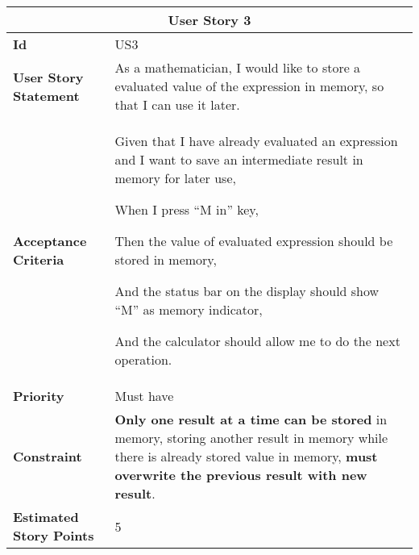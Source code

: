 \hspace{1cm}
\begin{center}
\begin{tabular}{ | m{2.3cm} | m{12cm} | } 

 \hline
 \multicolumn{2}{|c|}{\textbf{User Story 3}} \\

\hline
\textbf{Id} & US3 \\ 

\hline
\textbf{User Story Statement} &  As a mathematician, I would like to store a evaluated value of the expression in memory, so that I can use it later.\\

\hline
\textbf{Acceptance Criteria} & Given that I have already evaluated an expression and I want to save an intermediate result in memory for later use,

When I press ``M in'' key,

Then the value of evaluated expression should be stored in memory,

And the status bar on the display should show ``M'' as memory indicator,

And the calculator should allow me to do the next operation.\\ 

\hline
\textbf{Priority} & Must have \\ 

\hline
\textbf{Constraint} & \textbf{Only one result at a time can be stored} in memory, storing another result in memory while there is already stored value in memory, \textbf{ must overwrite the previous result with new result}.\\ 

\hline
\textbf{Estimated Story Points} & 5 \\ 
\hline

\end{tabular}
\end{center}


